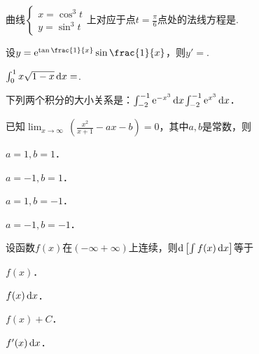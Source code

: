 \documentclass[plain,noanswer,medmath]{../../template/jnuexam}
\begin{document}






\begin{problem}
曲线$\begin{cases}
  x= \cos^3 t \\
  y= \sin^3 t
\end{cases}$上对应于点$t=\frac{\pi}{6}$点处的法线方程是\fillin{}.
\end{problem}


\begin{problem}
设$y=\e^{\tan\frac{1}{x}}\sin\frac{1}{x}$，则$y'=$\fillin{}.
\end{problem}


\begin{problem}
$\int_0^1x\sqrt{1-x}\mathop{}\!\mathrm{d} x=$\fillin{}.
\end{problem}


\begin{problem}
下列两个积分的大小关系是：$\int_{-2}^{-1}\mathrm{e}^{-x^3}\mathop{}\!\mathrm{d} x$\fillin{}$\int_{-2}^{-1}\mathrm{e}^{x^3}\mathop{}\!\mathrm{d} x$．
\end{problem}






\begin{problem}
已知$\lim_{x\to \infty}\,\left(\frac{x^2}{x+1}-ax-b \right)=0$，其中$a,b$是常数，则\pickout{}
\begin{abcd}
\item $a=1,b=1$．
\item $a=-1,b=1$．
\item $a=1,b=-1$．
\item $a=-1,b=-1$．
\end{abcd}
\end{problem}


\begin{problem}
设函数$f(x)$在$(-\infty +\infty)$上连续，则$\d\left[\int f(x)\dx \right]$等于\pickout{}
\begin{abcd}
\item $f(x)$．
\item $f(x)\mathop{}\!\mathrm{d} x$．
\item $f(x)+C$．
\item $f'(x)\mathop{}\!\mathrm{d} x$．
\end{abcd}
\end{problem}
\end{document}
